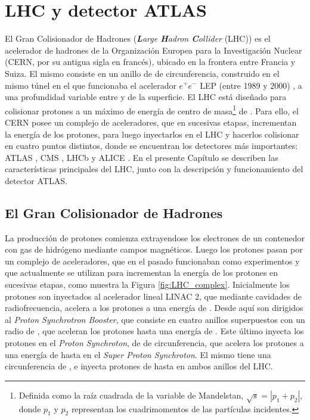\chapter{LHC y detector ATLAS}




El Gran Colisionador de Hadrones (\textit{\textbf{L}arge \textbf{H}adron \textbf{C}ollider} (LHC)) \cite{Evans:1129806} es el acelerador de hadrones de la Organización Europea para la Investigación Nuclear (CERN, por su antigua sigla en francés), ubicado en la frontera entre Francia y Suiza. El mismo consiste en un anillo de  de circunferencia, construido en el mismo túnel en el que funcionaba el acelerador $e^{+}e^{-}$ LEP (entre 1989 y 2000) \cite{LEPbook}, a una profundidad variable entre  y  de la superficie. El LHC está diseñado para colisionar protones a un máximo de energía de centro de masa\footnote{Definida como la raíz cuadrada de la variable de Mandelstan, $\sqrt{s}=|p_1+p_2|$, donde $p_1$ y $p_2$ representan los cuadrimomentos de las partículas incidentes.} de . Para ello, el CERN posee un complejo de aceleradores, que en sucesivas etapas, incrementan la energía de los protones, para luego inyectarlos en el LHC y hacerlos colisionar en cuatro puntos distintos, donde se encuentran los detectores más importantes: ATLAS \cite{PERF-2007-01}, CMS \cite{CMS-TDR-08-001}, LHCb \cite{LHCb:2008vvz} y ALICE \cite{ALICE:2008ngc}. En el presente Capítulo se describen las características principales del LHC, junto con la descripción y funcionamiento del detector ATLAS.

\section{El Gran Colisionador de Hadrones}

La producción de protones comienza extrayendose los electrones de un contenedor con gas de hidrógeno mediante campos magnéticos. Luego los protones pasan por un complejo de aceleradores, que en el pasado funcionaban como experimentos y que actualmente se utilizan para incrementan la energía de los protones en sucesivas etapas, como muestra la Figura \ref{fig:LHC_complex}. Inicialmente los protones son inyectados al acelerador lineal LINAC 2, que mediante cavidades de radiofrecuencia, acelera a los protones a una energía de . Desde aquí son dirigidos al \textit{Proton Synchrotron Booster}, que consiste en cuatro anillos superpuestos con un radio de , que aceleran los protones hasta una energía de . Este último inyecta los protones en el \textit{Proton Synchroton}, de  de circunferencia, que acelera los protones a una energía de hasta  en el \textit{Super Proton Synchroton}. El mismo tiene una circunferencia de , e inyecta protones de hasta  en ambos anillos del LHC. 


